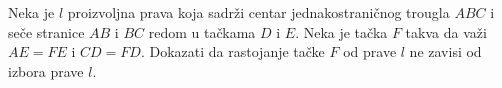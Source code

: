 \problem{}
Neka je $l$ proizvoljna prava koja sadrži centar jednakostraničnog trougla $ABC$ i seče stranice $AB$ i $BC$ redom u tačkama $D$ i $E$.
Neka je tačka $F$ takva da važi $AE = FE$ i $CD = FD$.
Dokazati da rastojanje tačke $F$ od prave $l$ ne zavisi od izbora prave $l$.
\solution
\endproblem
